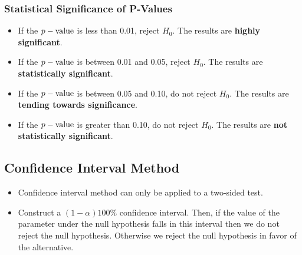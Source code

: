 \documentclass[12pt, letterpaper]{article}
\begin{document}
            \subsubsection{Statistical Significance of P-Values}
                \begin{itemize}
                    \item If the $p-\textnormal{value}$ is less than 0.01, reject $H_0$. The results are \textbf{highly significant}.
                    \item If the $p-\textnormal{value}$ is between 0.01 and 0.05, reject $H_0$. The results are \textbf{statistically significant}.
                    \item If the $p-\textnormal{value}$ is between 0.05 and 0.10, do not reject $H_0$. The results are \textbf{tending towards significance}.
                    \item If the $p-\textnormal{value}$ is greater than 0.10, do not reject $H_0$. The results are \textbf{not statistically significant}.
                \end{itemize}
        \subsection{Confidence Interval Method}
            \begin{itemize}
                \item Confidence interval method can only be applied to a two-sided test.
                \item Construct a $(1-\alpha)100\%$ confidence interval. Then, if the value of the parameter under the null hypothesis falls in this interval then we do not reject the null hypothesis. Otherwise we reject the null hypothesis in favor of the alternative.
            \end{itemize}
\end{document}
